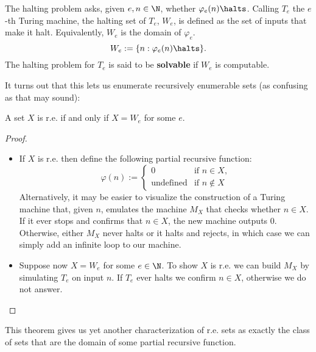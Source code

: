 \documentclass[../main.tex]{memoir}
\begin{document}
\begin{definition}
  The halting problem asks, given $e, n \in \N$, whether $\varphi_e(n) \halts$. Calling $T_e$ the $e$-th Turing machine, the halting set of $T_e$, $W_e$, is defined as the set of inputs that make it halt. Equivalently, $W_e$ is the domain of $\varphi_e$.
  \[ W_e := \{n : \varphi_e(n) \halts\}. \]
  The halting problem for $T_e$ is said to be \textbf{solvable} if $W_e$ is computable.
\end{definition}

It turns out that this lets us enumerate recursively enumerable sets (as confusing as that may sound):

\begin{theorem}
  \label{thm:normal-form-re}
  A set $X$ is r.e. if and only if $X = W_e$ for some $e$.
\end{theorem}
\begin{proof}
  \begin{itemize}
  \item If $X$ is r.e. then define the following partial recursive function:
    \begin{equation*}
      \varphi(n) := \left\{
        \begin{array}{lr}
          0 & \text{if } n \in X \text{,} \\
          \text{undefined} & \text{if } n \not\in X
        \end{array}\right.
    \end{equation*}
    Alternatively, it may be easier to visualize the construction of a Turing machine that, given $n$, emulates the machine $M_X$ that checks whether $n \in X$. If it ever stops and confirms that $n \in X$, the new machine outputs $0$. Otherwise, either $M_X$ never halts or it halts and rejects, in which case we can simply add an infinite loop to our machine.
  \item Suppose now $X = W_e$ for some $e \in \N$. To show $X$ is r.e. we can build $M_X$ by simulating $T_e$ on input $n$. If $T_e$ ever halts we confirm $n \in X$, otherwise we do not answer.
  \end{itemize}
\end{proof}

\begin{remark}
  This theorem gives us yet another characterization of r.e. sets as exactly the class of sets that are the domain of some partial recursive function.
\end{remark}
\end{document}
